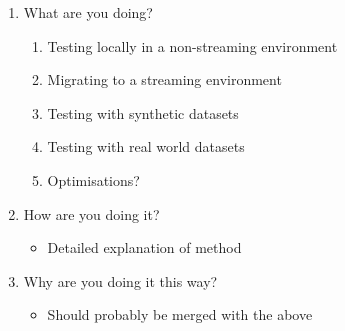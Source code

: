 \begin{enumerate}
    \item What are you doing?
    \begin{enumerate}
        \item Testing locally in a non-streaming environment
        \item Migrating to a streaming environment 
        \item Testing with synthetic datasets
        \item Testing with real world datasets
        \item Optimisations?
    \end{enumerate}
    \item How are you doing it?
    \begin{itemize}
        \item Detailed explanation of method
    \end{itemize}
    \item Why are you doing it this way?
    \begin{itemize}
        \item Should probably be merged with the above
    \end{itemize}
\end{enumerate}